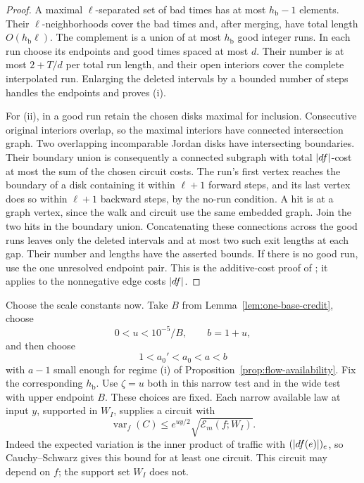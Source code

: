 \begin{proof}
A maximal \(\ell\)-separated set of bad times has at most
\(h_{\mathrm b}-1\) elements.  Their \(\ell\)-neighborhoods
cover the bad times and, after merging, have total length
\(O(h_{\mathrm b}\ell)\).  The complement is a union of at
most \(h_{\mathrm b}\) good integer runs.  In each run choose
its endpoints and good times spaced at most \(d\).  Their
number is at most \(2+T/d\) per total run length, and their
open interiors cover the complete interpolated run.  Enlarging
the deleted intervals by a bounded number of steps handles
the endpoints and proves (i).

For (ii), in a good run retain the chosen disks maximal for
inclusion.  Consecutive original interiors overlap, so the
maximal interiors have connected intersection graph.  Two
overlapping incomparable Jordan disks have intersecting
boundaries.  Their boundary union is consequently a connected
subgraph with total \(\lvert df\rvert\)-cost at most the sum of the
chosen circuit costs.  The run's first vertex reaches the
boundary of a disk containing it within \(\ell+1\) forward
steps, and its last vertex does so within \(\ell+1\) backward
steps, by the no-run condition.  A hit is at a graph vertex,
since the walk and circuit use the same embedded graph.
Join the two hits in the boundary union.  Concatenating these
connections across the good runs leaves only the deleted
intervals and at most two such exit lengths at each gap.
Their number and lengths have the asserted bounds.  If there
is no good run, use the one unresolved endpoint pair.  This
is the additive-cost proof of \cite[Lemma~12.2]{P}; it applies
to the nonnegative edge costs \(\lvert df\rvert\).
\end{proof}

Choose the scale constants now.  Take \(B\) from
Lemma~\ref{lem:one-base-credit}, choose
\[
 0<u<10^{-5}/B,\qquad b=1+u,
\]
and then choose
\[
 1<a_0'<a_0<a<b
\]
with \(a-1\) small enough for regime (i) of
Proposition~\ref{prop:flow-availability}.  Fix the corresponding
\(h_{\mathrm b}\).  Use \(\zeta=u\) both in this narrow test
and in the wide test with upper endpoint \(B\).  These choices
are fixed.  Each narrow available law at input \(y\), supported
in \(W_I\), supplies a circuit with
\begin{equation}
\label{eq:one-circuit-bill}
 \operatorname{var}_f(C)
 \le e^{uy/2}\sqrt{\mathcal E_m(f;W_I)}.
\end{equation}
Indeed the expected variation is the inner product of traffic
with \((\lvert df(e)\rvert)_e\), so Cauchy--Schwarz gives this bound
for at least one circuit.  This circuit may depend on \(f\);
the support set \(W_I\) does not.

